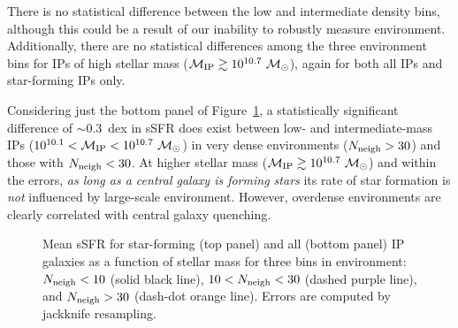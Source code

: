 There is no statistical difference between the low and intermediate density bins, although this could be a result of our inability to robustly measure environment.
Additionally, there are no statistical differences among the three environment bins for IPs of high stellar mass ($\mIP\gtrsim10^{10.7}~\msun$),
again for both all IPs and star-forming IPs only.

Considering just the bottom panel of Figure~\ref{fig:sSFR_vs_mstar}, a statistically significant difference of $\sim0.3$~dex in sSFR
does exist between low- and intermediate-mass IPs (${10^{10.1}<\mIP<10^{10.7}~\msun}$) in very dense environments (${\Nneigh>30}$) and those with ${\Nneigh<30}$.
At higher stellar mass ($\mIP\gtrsim10^{10.7}~\msun$) and within the errors, 
\emph{as long as a central galaxy is forming stars} its rate of star formation is \emph{not} influenced by large-scale environment.
However, overdense environments are clearly correlated with central galaxy quenching.



%
%

\begin{figure}
  \epstrim{0in 0.1in 0.4in 0.7in}
  \caption{
Mean sSFR for star-forming (top panel) and all (bottom panel) IP galaxies as a function of stellar mass for three bins in environment:~${\Nneigh<10}$ (solid black line), ${10<\Nneigh<30}$ (dashed purple line), and ${\Nneigh>30}$ (dash-dot orange line). Errors are computed by jackknife resampling.
}
  \label{fig:sSFR_vs_mstar}
\end{figure}

